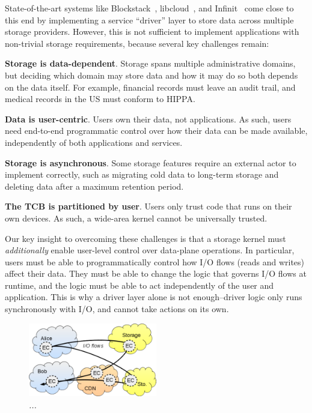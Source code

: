 State-of-the-art systems like Blockstack~\cite{blockstack},
libcloud~\cite{libcloud}, and Infinit~\cite{infinite} come close to this
end by implementing a service ``driver'' layer to
store data across multiple storage providers.  However, this is not
sufficient to implement applications with non-trivial storage requirements,
because several key challenges remain:

\textbf{Storage is data-dependent}. Storage spans multiple
administrative domains, but deciding which domain may store data and how it may
do so both depends on the data itself. For example, financial records must leave
an audit trail, and medical records in the US must conform to HIPPA.

\textbf{Data is user-centric}. Users own their data, not applications.
As such, users need end-to-end programmatic control over how their data
can be made available, independently of both applications and services.

\textbf{Storage is asynchronous}. Some storage features require an external
actor to implement correctly, such as migrating cold data to long-term storage
and deleting data after a maximum retention period.

\textbf{The TCB is partitioned by user}.  Users only trust code that runs on their own
devices.  As such, a wide-area kernel cannot be universally trusted.

Our key insight to overcoming these challenges is that a storage kernel
must \textit{additionally} enable user-level control over data-plane operations.
In particular, users must be able to programmatically
control how I/O flows (reads and writes) affect their data.  They must be able to change the
logic that governs I/O flows at runtime, and the logic must be able to
act independently of the user and application.  This is why a driver layer alone is
not enough--driver logic only runs synchronously with I/O, and cannot take
actions on its own.

\begin{figure}[t!]
\centering
\includegraphics[width=0.5\textwidth]{figures/execution-contexts}
\caption{\it...}
\label{fig:execution-contexts}
\end{figure}


